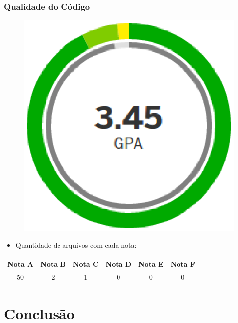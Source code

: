 \documentclass{beamer}
\begin{document}
\begin{frame}
\frametitle{Qualidade do Código}

\begin{figure}[!h]
	\centering
	\includegraphics[scale=0.5]{figuras/gpa.eps}
\end{figure}

\begin{itemize}
	\item{Quantidade de arquivos com cada nota:}
\end{itemize}

\begin{table}[!h]
\centering
\begin{tabular}{cccccc}
\toprule
\textbf{Nota A} & \textbf{Nota B} & \textbf{Nota C} & \textbf{Nota D} & \textbf{Nota E} & \textbf{Nota F} \\ \midrule
50 & 2 & 1 & 0 & 0 & 0							   \\ \bottomrule
\end{tabular}
\end{table}

\end{frame}

\section{Conclusão}
\end{document}
